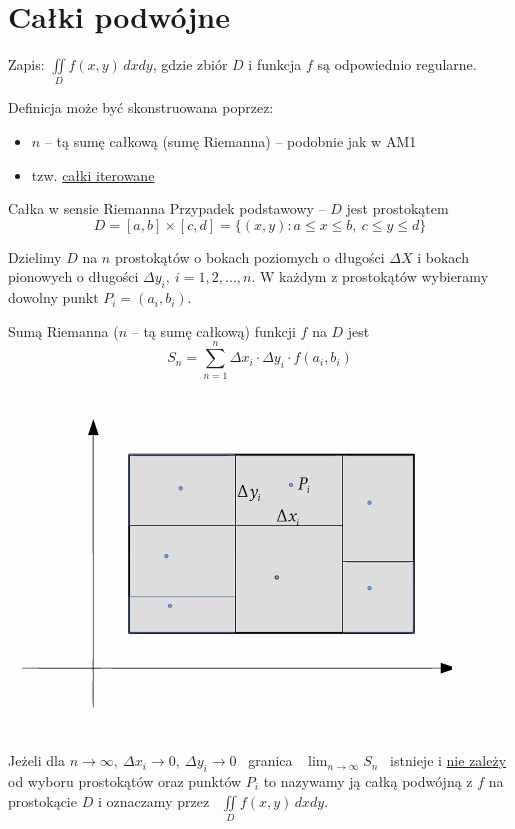\chapter{Całki podwójne}

Zapis: $ \iint\limits_{D} f(x,y)\, dxdy $, gdzie zbiór $D$ i funkcja $f$ są odpowiednio regularne.

Definicja może być skonstruowana poprzez:
\begin{itemize}
    \item $n$ -- tą sumę całkową (sumę Riemanna) -- podobnie jak w AM1
    \item tzw. \underline{całki iterowane}
\end{itemize}
\bigskip

\begin{tw}{Całka w sensie Riemanna}
Przypadek podstawowy -- $D$ jest prostokątem
\[ D = [a,b] \times [c,d] = \{ (x,y): a \leq x \leq b, \ c \leq y \leq d \} \]

Dzielimy $D$ na $n$ prostokątów o bokach poziomych o długości $\Delta X$ i bokach pionowych o długości $\Delta y_i, \ i = 1,2,...,n$.
W każdym z prostokątów wybieramy dowolny punkt $P_i = (a_i, b_i)$.

Sumą Riemanna ($n$ -- tą sumę całkową) funkcji $f$ na $D$ jest
\[ S_n = \sum\limits_{n=1}^{n} \Delta x_i \cdot \Delta y_i \cdot f(a_i, b_i) \]
\end{tw}

\begin{center}
    \includegraphics[scale=0.8]{img/prostokat1.png}
\end{center}

Jeżeli dla $ n \to \infty, \ \Delta x_i \to 0, \ \Delta y_i \to 0 $ \ granica \ $ \lim_{n \to \infty} S_n $ \ istnieje i \underline{nie zależy}
od wyboru prostokątów oraz punktów $P_i$ to nazywamy ją całką podwójną z $f$ na prostokącie $D$ i oznaczamy przez \ $ \iint\limits_D f(x,y) \, dxdy $.
\bigskip

